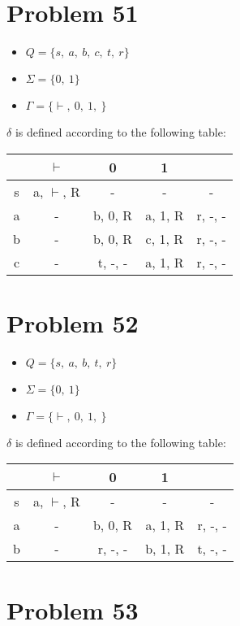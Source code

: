 \documentclass[11pt]{article}
\begin{document}
\section*{Problem 51}

\begin{itemize}
	\item $Q = \{ s,\ a,\ b,\ c,\ t,\ r \}$
	\item $\Sigma = \{0,\ 1\}$
	\item $\Gamma = \{ \vdash,\ 0,\ 1,\ $\textvisiblespace$\}$
\end{itemize}

$\delta$ is defined according to the following table:


\begin{tabular}{ c | c | c | c | c }
			& $\vdash$				& 0 					& 1				& \textvisiblespace \\
		\hline
		s	& a, $\vdash$, R		& -					& -				& - \\
		a	& -							& b, 0, R			& a, 1, R		& r, -, - \\
		b	& -							& b, 0, R			& c, 1, R		& r, -, - \\
		c	& -							& t, -, -				& a, 1, R		& r, -, -
\end{tabular}


\section*{Problem 52}

\begin{itemize}
	\item $Q = \{ s,\ a,\ b,\ t,\ r \}$
	\item $\Sigma = \{0,\ 1\}$
	\item $\Gamma = \{ \vdash,\ 0,\ 1,\ $\textvisiblespace$\}$
\end{itemize}

$\delta$ is defined according to the following table:


\begin{tabular}{ c | c | c | c | c }
			& $\vdash$				& 0 					& 1				& \textvisiblespace \\
		\hline
		s	& a, $\vdash$, R		& -					& -				& - \\
		a	& -							& b, 0, R			& a, 1, R		& r, -, - \\
		b	& -							& r, -, -				& b, 1, R		& t, -, - \\
\end{tabular}

\section*{Problem 53}
\end{document}
